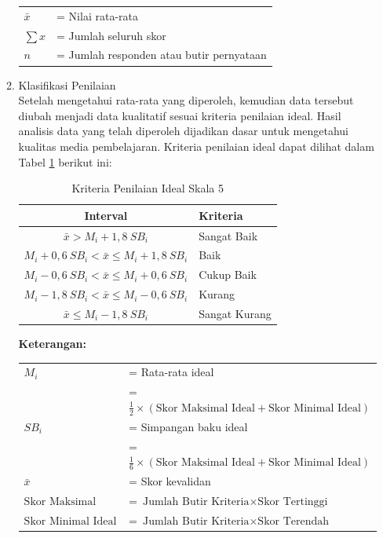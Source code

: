 \documentclass[12pt]{article}
\begin{document}
\begin{enumerate}
\begin{enumerate}
        \begin{tabular}{@{}l l@{}}
        \( \bar{x} \)     & = Nilai rata-rata \\
        \( \sum x \)      & = Jumlah seluruh skor \\
        \( n \)           & = Jumlah responden atau butir pernyataan
        \end{tabular}

        \item Klasifikasi Penilaian\\
        \hspace*{1cm}Setelah mengetahui rata-rata yang diperoleh, kemudian data tersebut diubah menjadi data kualitatif sesuai kriteria penilaian ideal. Hasil analisis data yang telah diperoleh dijadikan dasar untuk mengetahui kualitas media pembelajaran. Kriteria penilaian ideal dapat dilihat dalam Tabel \ref{kriteriaskala5} berikut ini:
        \begin{table}[H]
            \centering
            \caption{Kriteria Penilaian Ideal Skala 5}
            \label{kriteriaskala5}
            \begin{tabular}{|c|p{3cm}|}
                \hline
                \textbf{Interval} & \textbf{Kriteria}\\
                \hline
                \( \bar{x} > M_i + 1{,}8~SB_i \) & Sangat Baik\\
                \( M_i + 0{,}6~SB_i < \bar{x} \leq M_i + 1{,}8~SB_i \) & Baik\\
                \( M_i - 0{,}6~SB_i < \bar{x} \leq M_i + 0{,}6~SB_i  \) & Cukup Baik\\
                \( M_i - 1{,}8~SB_i < \bar{x} \leq M_i - 0{,}6~SB_i \) & Kurang\\
                \( \bar{x} \leq M_i - 1{,}8~SB_i \) & Sangat Kurang\\
                \hline
            \end{tabular}
        \end{table}
        \textbf{Keterangan:}

        \begin{tabular}{@{}l l@{}}
        \( M_i \)      & = Rata-rata ideal \\
                    & = \( \frac{1}{2} \times (\text{Skor Maksimal Ideal} + \text{Skor Minimal Ideal}) \) \\[0.5em]
        \( SB_i \)     & = Simpangan baku ideal \\
                    & = \( \frac{1}{6} \times (\text{Skor Maksimal Ideal} + \text{Skor Minimal Ideal}) \) \\[0.5em]
        \( \bar{x} \)  & = Skor kevalidan \\[0.5em]
        \( \text{Skor Maksimal Ideal} \) & = \( \text{Jumlah Butir Kriteria} \times \text{Skor Tertinggi} \) \\[0.5em]
        \( \text{Skor Minimal Ideal} \)  & = \( \text{Jumlah Butir Kriteria} \times \text{Skor Terendah} \)\\
        \end{tabular}


\end{enumerate}
\end{enumerate}
\end{document}
